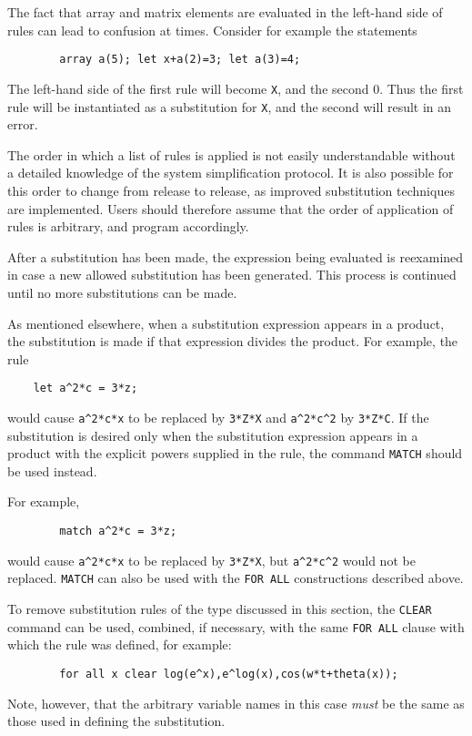 The fact that array and matrix elements are evaluated in the left-hand side
of rules can lead to confusion at times. Consider for example the
statements
\begin{verbatim}
        array a(5); let x+a(2)=3; let a(3)=4;
\end{verbatim}
The left-hand side of the first rule will become {\tt X}, and the second
0.  Thus the first rule will be instantiated as a substitution for
{\tt X}, and the second will result in an error.

The order in which a list of rules is applied is not easily understandable
without a detailed knowledge of the system simplification protocol. It is
also possible for this order to change from release to release, as improved
substitution techniques are implemented. Users should therefore assume
that the order of application of rules is arbitrary, and program
accordingly.

After a substitution has been made, the expression being evaluated is
reexamined in case a new allowed substitution has been generated. This
process is continued until no more substitutions can be made.

As mentioned elsewhere, when a substitution expression appears in a
product, the substitution is made if that expression divides the product.
For example, the rule
\begin{verbatim}
	let a^2*c = 3*z;
\end{verbatim}
would cause {\tt a\verb|^|2*c*x} to be replaced by {\tt 3*Z*X} and
{\tt a\verb|^|2*c\verb|^|2} by {\tt 3*Z*C}.  If the substitution is desired only
when the substitution expression appears in a product with the explicit
powers supplied in the rule, the command {\tt MATCH} should be used
instead.

For example,
\begin{verbatim}
        match a^2*c = 3*z;
\end{verbatim}
would cause {\tt a\verb|^|2*c*x} to be replaced by {\tt 3*Z*X}, but
{\tt a\verb|^|2*c\verb|^|2} would not be replaced. {\tt MATCH} can also be used
with the {\tt FOR ALL} constructions described above.

To remove substitution rules of the type discussed in this section, the
{\tt CLEAR} command can be used, combined, if necessary,
with the same {\tt FOR ALL} clause with which the rule was defined, for
example:
\begin{verbatim}
        for all x clear log(e^x),e^log(x),cos(w*t+theta(x));
\end{verbatim}
Note, however, that the arbitrary variable names in this case {\em must\/}
be the same as those used in defining the substitution.

